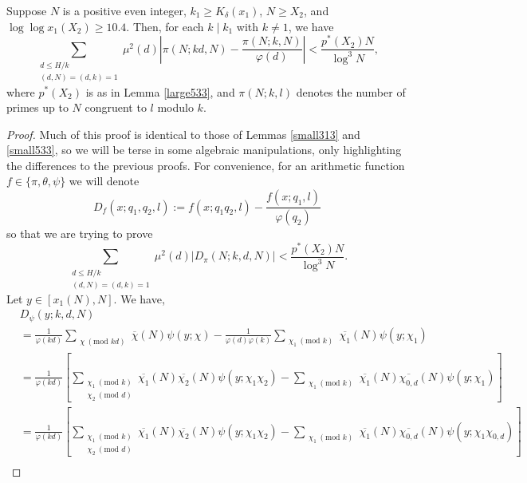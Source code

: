 \documentclass[12pt]{amsart}
\begin{document}
\begin{lemma}\label{large534}
    Suppose $N$ is a positive even integer, $k_1\ge K_{\delta}(x_1)$, $N \ge X_2$, and $\log\log x_1(X_2)\ge 10.4$. Then, for each $k\mid k_1$ with $k\neq 1$, we have
    \begin{equation*}
        \sum_{\substack{d\le H/k \\ (d,N)=(d,k)=1}} \mu^2(d)\left|\pi(N;kd,N)-\frac{\pi(N;k,N)}{\varphi(d)}\right|<\frac{p^*(X_2)N}{\log^3 N},
    \end{equation*}
    where $p^*(X_2)$ is as in Lemma \ref{large533}, and $\pi(N; k, l)$ denotes the number of primes up to $N$ congruent to $l$ modulo $k$.
\end{lemma}
\begin{proof}
    Much of this proof is identical to those of Lemmas \ref{small313} and \ref{small533}, so we will be terse in some algebraic manipulations, only highlighting the differences to the previous proofs. For convenience, for an arithmetic function $f \in \{ \pi, \theta, \psi\}$ we will denote
    \begin{equation} \label{eq: def-D-f-x-q1-q2-l}
        D_{f}(x; q_1, q_2, l) := f(x; q_1 q_2, l) - \frac{f(x; q_1, l)}{\varphi(q_2)}
    \end{equation}
    so that we are trying to prove
    \begin{equation*}
        \sum_{\substack{d\le H/k \\(d,N)=(d,k)=1}} \mu^2(d)\left|D_{\pi}(N; k, d, N)\right|<\frac{p^*(X_2)N}{\log^3 N}.
    \end{equation*}
    Let $y\in[x_1(N),N]$. We have,
    \begin{align*}
        &D_{\psi}(y; k, d, N)\\
        &=\frac{1}{\varphi(kd)}\sum_{\substack{\chi\:(\text{mod } kd)}}\overline{\chi}(N)\psi(y;\chi) - \frac{1}{\varphi(d)\varphi(k)}\sum_{\substack{\chi_1\:(\text{mod } k)}}\overline{\chi_1}(N)\psi(y;\chi_1) \\
        &=\frac{1}{\varphi(kd)}\left[\sum_{\substack{\chi_1\:(\text{mod } k) \\ \chi_2\: (\text{mod }d)}}\overline{\chi_1}(N)\overline{\chi_2}(N)\psi(y;\chi_1\chi_2) - \sum_{\substack{\chi_1\:(\text{mod } k)}}\overline{\chi_1}(N)\overline{\chi_{0,d}}(N)\psi(y;\chi_1)\right] \\
        &=\frac{1}{\varphi(kd)}
        \left[\sum_{\substack{\chi_1\:(\text{mod } k) \\ \chi_2\: (\text{mod }d)}}\overline{\chi_1}(N)\overline{\chi_2}(N)\psi(y;\chi_1\chi_2) - \sum_{\substack{\chi_1\:(\text{mod } k)}}\overline{\chi_1}(N)\overline{\chi_{0,d}}(N)\psi(y;\chi_1 \chi_{0,d})\right] \\

\end{align*}
\end{proof}
\end{document}
